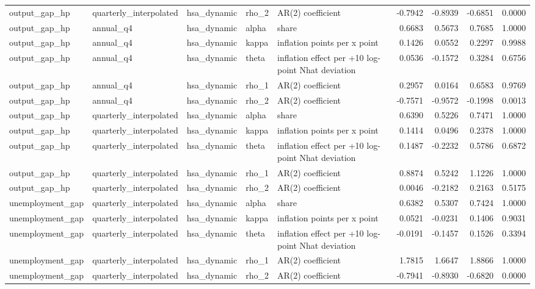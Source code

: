 \begin{tabular}{lllllrrrr}
output\_gap\_hp & quarterly\_interpolated & hsa\_dynamic & rho\_2 & AR(2) coefficient & -0.7942 & -0.8939 & -0.6851 & 0.0000 \\
output\_gap\_hp & annual\_q4 & hsa\_dynamic & alpha & share & 0.6683 & 0.5673 & 0.7685 & 1.0000 \\
output\_gap\_hp & annual\_q4 & hsa\_dynamic & kappa & inflation points per x point & 0.1426 & 0.0552 & 0.2297 & 0.9988 \\
output\_gap\_hp & annual\_q4 & hsa\_dynamic & theta & inflation effect per +10 log-point Nhat deviation & 0.0536 & -0.1572 & 0.3284 & 0.6756 \\
output\_gap\_hp & annual\_q4 & hsa\_dynamic & rho\_1 & AR(2) coefficient & 0.2957 & 0.0164 & 0.6583 & 0.9769 \\
output\_gap\_hp & annual\_q4 & hsa\_dynamic & rho\_2 & AR(2) coefficient & -0.7571 & -0.9572 & -0.1998 & 0.0013 \\
output\_gap\_hp & quarterly\_interpolated & hsa\_dynamic & alpha & share & 0.6390 & 0.5226 & 0.7471 & 1.0000 \\
output\_gap\_hp & quarterly\_interpolated & hsa\_dynamic & kappa & inflation points per x point & 0.1414 & 0.0496 & 0.2378 & 1.0000 \\
output\_gap\_hp & quarterly\_interpolated & hsa\_dynamic & theta & inflation effect per +10 log-point Nhat deviation & 0.1487 & -0.2232 & 0.5786 & 0.6872 \\
output\_gap\_hp & quarterly\_interpolated & hsa\_dynamic & rho\_1 & AR(2) coefficient & 0.8874 & 0.5242 & 1.1226 & 1.0000 \\
output\_gap\_hp & quarterly\_interpolated & hsa\_dynamic & rho\_2 & AR(2) coefficient & 0.0046 & -0.2182 & 0.2163 & 0.5175 \\
unemployment\_gap & quarterly\_interpolated & hsa\_dynamic & alpha & share & 0.6382 & 0.5307 & 0.7424 & 1.0000 \\
unemployment\_gap & quarterly\_interpolated & hsa\_dynamic & kappa & inflation points per x point & 0.0521 & -0.0231 & 0.1406 & 0.9031 \\
unemployment\_gap & quarterly\_interpolated & hsa\_dynamic & theta & inflation effect per +10 log-point Nhat deviation & -0.0191 & -0.1457 & 0.1526 & 0.3394 \\
unemployment\_gap & quarterly\_interpolated & hsa\_dynamic & rho\_1 & AR(2) coefficient & 1.7815 & 1.6647 & 1.8866 & 1.0000 \\
unemployment\_gap & quarterly\_interpolated & hsa\_dynamic & rho\_2 & AR(2) coefficient & -0.7941 & -0.8930 & -0.6820 & 0.0000 \\

\end{tabular}

